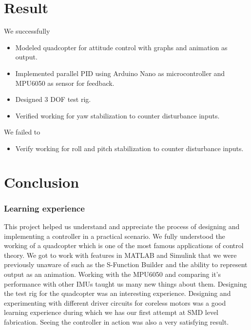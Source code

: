 \documentclass[9pt]{article}
\begin{document}
\newpage

\part{Result}

\noindent We successfully

\begin{itemize}
\item Modeled quadcopter for attitude control with graphs and animation as output.
\item Implemented parallel PID using Arduino Nano as microcontroller and MPU6050 as sensor for feedback.
\item Designed $3$ DOF test rig.
\item Verified working for yaw stabilization to counter disturbance inputs.
\end{itemize}

\noindent We failed to

\begin{itemize}
\item Verify working for roll and pitch stabilization to counter disturbance inputs.
\end{itemize}

\part{Conclusion}

\section{Learning experience}
This project helped us understand and appreciate the process of designing and implementing a controller in a practical scenario. We fully understood the working of a quadcopter which is one of the most famous applications of control theory. We got to work with features in MATLAB and Simulink that we were previously unaware of such as the S-Function Builder and the ability to represent output as an animation. Working with the MPU6050 and comparing it's performance with other IMUs taught us many new things about them. Designing the test rig for the quadcopter was an interesting experience. Designing and experimenting with different driver circuits for coreless motors was a good learning experience during which we has our first attempt at SMD level fabrication. Seeing the controller in action was also a very satisfying result.
\end{document}
